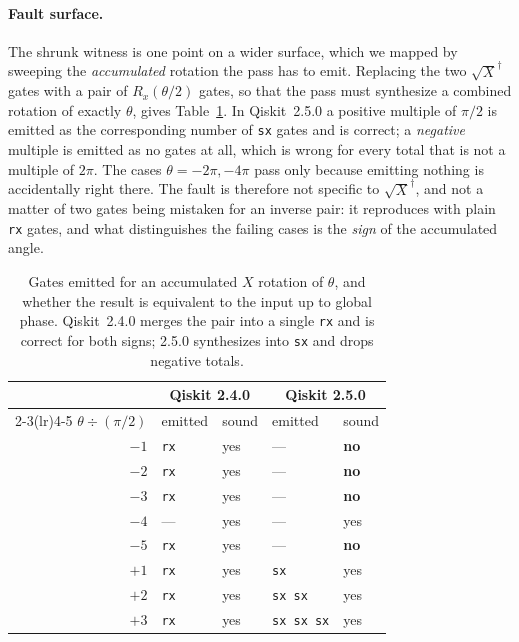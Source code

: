 \documentclass[11pt]{article}
\begin{document}
\paragraph{Fault surface.}
The shrunk witness is one point on a wider surface, which we mapped by
sweeping the \emph{accumulated} rotation the pass has to emit. Replacing
the two $\sqrt{X}^\dagger$ gates with a pair of $R_x(\theta/2)$ gates, so
that the pass must synthesize a combined rotation of exactly $\theta$,
gives Table~\ref{tab:sweep}. In Qiskit~2.5.0 a positive multiple of
$\pi/2$ is emitted as the corresponding number of \texttt{sx} gates and
is correct; a \emph{negative} multiple is emitted as no gates at all,
which is wrong for every total that is not a multiple of $2\pi$. The
cases $\theta = -2\pi, -4\pi$ pass only because emitting nothing is
accidentally right there. The fault is therefore not specific to
$\sqrt{X}^\dagger$, and not a matter of two gates being mistaken for an
inverse pair: it reproduces with plain \texttt{rx} gates, and what
distinguishes the failing cases is the \emph{sign} of the accumulated
angle.

\begin{table}[h]
\centering
\small
\begin{tabular}{rllll}
\toprule
& \multicolumn{2}{c}{Qiskit 2.4.0} & \multicolumn{2}{c}{Qiskit 2.5.0} \\
\cmidrule(lr){2-3}\cmidrule(lr){4-5}
$\theta \div (\pi/2)$ & emitted & sound & emitted & sound \\
\midrule
$-1$ & \texttt{rx} & yes & --- & \textbf{no} \\
$-2$ & \texttt{rx} & yes & --- & \textbf{no} \\
$-3$ & \texttt{rx} & yes & --- & \textbf{no} \\
$-4$ & --- & yes & --- & yes \\
$-5$ & \texttt{rx} & yes & --- & \textbf{no} \\
$+1$ & \texttt{rx} & yes & \texttt{sx} & yes \\
$+2$ & \texttt{rx} & yes & \texttt{sx sx} & yes \\
$+3$ & \texttt{rx} & yes & \texttt{sx sx sx} & yes \\
\bottomrule
\end{tabular}
\caption{Gates emitted for an accumulated $X$ rotation of $\theta$, and
whether the result is equivalent to the input up to global phase.
Qiskit~2.4.0 merges the pair into a single \texttt{rx} and is correct for
both signs; 2.5.0 synthesizes into \texttt{sx} and drops negative
totals.}
\label{tab:sweep}
\end{table}
\end{document}

